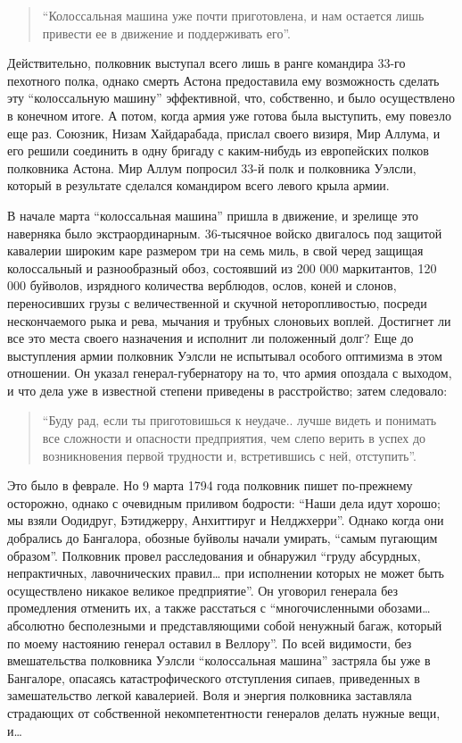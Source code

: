 \documentclass[
  oneside,
  12pt,
  titlepage]{book}
\begin{document}
\begin{quote}
``Колоссальная машина уже почти приготовлена, и нам остается лишь привести ее в движение и поддерживать его''.
\end{quote}

Действительно, полковник выступал всего лишь в ранге командира 33-го пехотного полка, однако смерть Астона предоставила ему возможность сделать эту ``колоссальную машину'' эффективной, что, собственно, и было осуществлено в конечном итоге. А потом, когда армия уже готова была выступить, ему повезло еще раз. Союзник, Низам Хайдарабада, прислал своего визиря, Мир Аллума, и его решили соединить в одну бригаду с каким-нибудь из европейских полков полковника Астона. Мир Аллум попросил 33-й полк и полковника Уэлсли, который в результате сделался командиром всего левого крыла армии.

В начале марта ``колоссальная машина'' пришла в движение, и зрелище это наверняка было экстраординарным. 36-тысячное войско двигалось под защитой кавалерии широким каре размером три на семь миль, в свой черед защищая колоссальный и разнообразный обоз, состоявший из 200 000 маркитантов, 120 000 буйволов, изрядного количества верблюдов, ослов, коней и слонов, переносивших грузы с величественной и скучной неторопливостью, посреди нескончаемого рыка и рева, мычания и трубных слоновьих воплей. Достигнет ли все это места своего назначения и исполнит ли положенный долг? Еще до выступления армии полковник Уэлсли не испытывал особого оптимизма в этом отношении. Он указал генерал-губернатору на то, что армия опоздала с выходом, и что дела уже в известной степени приведены в расстройство; затем следовало:

\begin{quote}
``Буду рад, если ты приготовишься к неудаче.. лучше видеть и понимать все сложности и опасности предприятия, чем слепо верить в успех до возникновения первой трудности и, встретившись с ней, отступить''.
\end{quote}

Это было в феврале. Но 9 марта 1794 года полковник пишет по-прежнему осторожно, однако с очевидным приливом бодрости: ``Наши дела идут хорошо; мы взяли Оодидруг, Бэтиджерру, Анхиттируг и Нелджхерри''. Однако когда они добрались до Бангалора, обозные буйволы начали умирать, ``самым пугающим образом''. Полковник провел расследования и обнаружил ``груду абсурдных, непрактичных, лавочнических правил\ldots{} при исполнении которых не может быть осуществлено никакое великое предприятие''. Он уговорил генерала без промедления отменить их, а также расстаться с ``многочисленными обозами\ldots{} абсолютно бесполезными и представляющими собой ненужный багаж, который по моему настоянию генерал оставил в Веллору''. По всей видимости, без вмешательства полковника Уэлсли ``колоссальная машина'' застряла бы уже в Бангалоре, опасаясь катастрофического отступления сипаев, приведенных в замешательство легкой кавалерией. Воля и энергия полковника заставляла страдающих от собственной некомпетентности генералов делать нужные вещи, и\ldots{}
\end{document}
